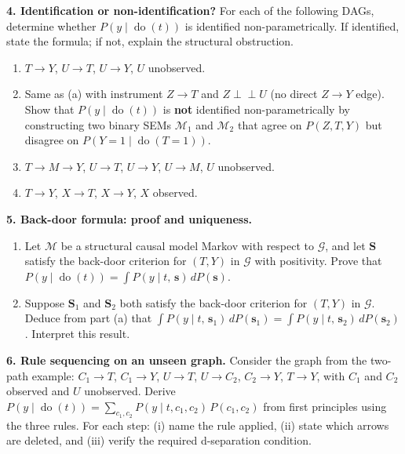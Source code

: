 \documentclass[
  a4paper,
]{book}
\providecommand{\tightlist}{%
  \setlength{\itemsep}{0pt}\setlength{\parskip}{0pt}}
\newcommand{\doop}{\operatorname{do}}
\newcommand{\indep}{\perp\!\!\!\perp}
\newcommand{\Gcal}{\mathcal{G}}
\begin{document}
\textbf{4. Identification or non-identification?} For each of the
following DAGs, determine whether \(P(y \mid \doop(t))\) is identified
non-parametrically. If identified, state the formula; if not, explain
the structural obstruction.

\begin{enumerate}
\def\labelenumi{(\alph{enumi})}
\tightlist
\item
  \(T \to Y\), \(U \to T\), \(U \to Y\), \(U\) unobserved.
\item
  Same as (a) with instrument \(Z \to T\) and \(Z \indep U\) (no direct
  \(Z \to Y\) edge). Show that \(P(y \mid \doop(t))\) is \textbf{not}
  identified non-parametrically by constructing two binary SEMs
  \(\mathcal{M}_1\) and \(\mathcal{M}_2\) that agree on \(P(Z, T, Y)\)
  but disagree on \(P(Y{=}1 \mid \doop(T{=}1))\).
\item
  \(T \to M \to Y\), \(U \to T\), \(U \to Y\), \(U \to M\), \(U\)
  unobserved.
\item
  \(T \to Y\), \(X \to T\), \(X \to Y\), \(X\) observed.
\end{enumerate}

\textbf{5. Back-door formula: proof and uniqueness.}

\begin{enumerate}
\def\labelenumi{(\alph{enumi})}
\tightlist
\item
  Let \(\mathcal{M}\) be a structural causal model Markov with respect
  to \(\Gcal\), and let \(\mathbf{S}\) satisfy the back-door criterion
  for \((T, Y)\) in \(\Gcal\) with positivity. Prove that
  \(P(y \mid \doop(t)) = \int P(y \mid t,\, \mathbf{s})\,dP(\mathbf{s})\).
\item
  Suppose \(\mathbf{S}_1\) and \(\mathbf{S}_2\) both satisfy the
  back-door criterion for \((T, Y)\) in \(\Gcal\). Deduce from part (a)
  that
  \(\int P(y \mid t,\, \mathbf{s}_1)\,dP(\mathbf{s}_1) = \int P(y \mid t,\, \mathbf{s}_2)\,dP(\mathbf{s}_2)\).
  Interpret this result.
\end{enumerate}

\textbf{6. Rule sequencing on an unseen graph.} Consider the graph from
the two-path example: \(C_1 \to T\), \(C_1 \to Y\), \(U \to T\),
\(U \to C_2\), \(C_2 \to Y\), \(T \to Y\), with \(C_1\) and \(C_2\)
observed and \(U\) unobserved. Derive
\(P(y \mid \doop(t)) = \sum_{c_1,c_2} P(y \mid t, c_1, c_2)\,P(c_1, c_2)\)
from first principles using the three rules. For each step: (i) name the
rule applied, (ii) state which arrows are deleted, and (iii) verify the
required d-separation condition.
\end{document}
